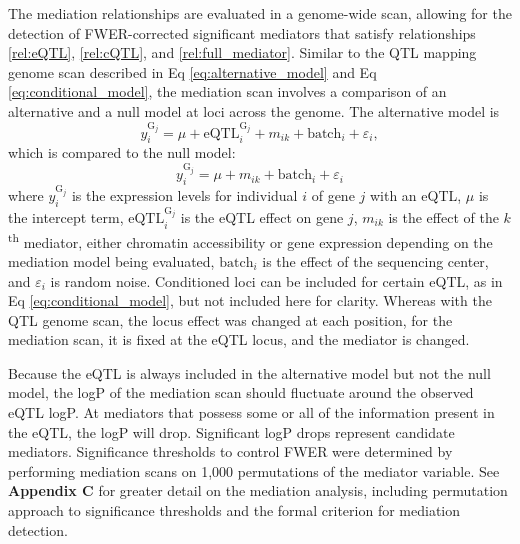 The mediation relationships are evaluated in a genome-wide  scan, allowing for the detection of FWER-corrected significant mediators that satisfy relationships \ref{rel:eQTL}, \ref{rel:cQTL}, and \ref{rel:full_mediator}. Similar to the QTL mapping genome scan described in Eq \ref{eq:alternative_model} and Eq \ref{eq:conditional_model}, the mediation scan involves a comparison of an alternative and a null model at loci across the genome. The alternative model is
\begin{equation}
y^{\text{G}_{j}}_{i} = \mu + \text{eQTL}_{i}^{\text{G}_{j}} + m_{ik} + \text{batch}_{i} + \varepsilon_{i},
\label{eq:mediation_alt}
\end{equation}
which is compared to the null model:
\begin{equation}
y^{\text{G}_{j}}_{i} = \mu + m_{ik} \nonumber + \text{batch}_{i} + \varepsilon_{i}
\label{eq:mediation_null}
\end{equation}
where $y^{\text{G}_{j}}_{i}$ is the expression levels for individual $i$ of gene $j$ with an eQTL, $\mu$ is the intercept term, $\text{eQTL}_{i}^{\text{G}_{j}}$ is the eQTL effect on gene $j$, $m_{ik}$ is the effect of the $k$\textsuperscript{th} mediator, either chromatin accessibility or gene expression depending on the mediation model being evaluated, $\text{batch}_{i}$ is the effect of the sequencing center, and $\varepsilon_{i}$ is random noise. Conditioned loci can be included for certain eQTL, as in Eq \ref{eq:conditional_model}, but not included here for clarity. Whereas with the QTL genome scan, the locus effect was changed at each position, for the mediation scan, it is fixed at the eQTL locus, and the mediator is changed.

Because the eQTL is always included in the alternative model but not the null model, the logP of the mediation scan should fluctuate around the observed eQTL logP. At mediators that possess some or all of the information present in the eQTL, the logP will drop. Significant logP drops represent candidate mediators. Significance thresholds to control FWER were determined by performing mediation scans on 1,000 permutations of the mediator variable. See \textbf{Appendix C} for greater detail on the mediation analysis, including permutation approach to significance thresholds and the formal criterion for mediation detection.

